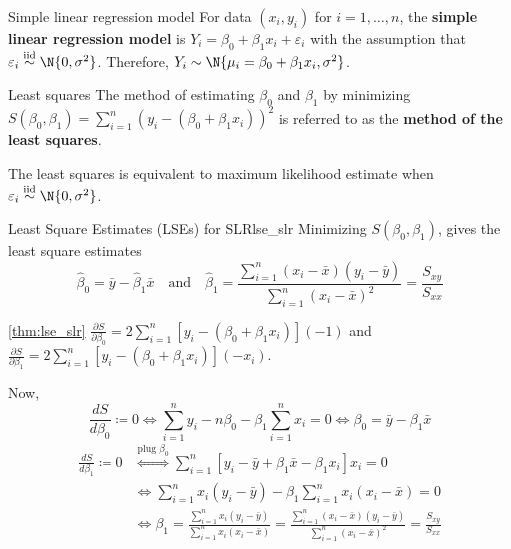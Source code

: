 \begin{Definition}{Simple linear regression model}{}
    For data $ (x_i,y_i) $ for $ i=1,\ldots,n $, the
    \textbf{simple linear regression model} is
    $ Y_i=\beta_0+\beta_1x_i+\varepsilon_i $
    with the assumption that
    $ \varepsilon_i\stackrel{\text{iid}}{\sim}\N{0,\sigma^2} $.
    Therefore,
    $ Y_i\sim \N{\mu_i=\beta_0+\beta_1x_i,\sigma^2} $.
\end{Definition}
\begin{Definition}{Least squares}{}
    The method of estimating $ \beta_0 $
    and $ \beta_1 $ by minimizing
    $ S(\beta_0,\beta_1)=\sum_{i=1}^{n}(y_i-(\beta_0+\beta_1x_i))^2 $
    is referred to as the \textbf{method of the least squares}.
\end{Definition}
\begin{Remark}{}{}
    The least squares is equivalent to maximum likelihood estimate
    when $ \varepsilon_i\stackrel{\text{iid}}{\sim}\N{0,\sigma^2} $.
\end{Remark}
\begin{Theorem}{Least Square Estimates (LSEs) for SLR}{lse_slr}
    Minimizing $ S(\beta_0,\beta_1) $, gives the
    least square estimates
    \[ \hat{\beta}_0=\bar{y}-\hat{\beta}_1\bar{x}\quad\text{and}
        \quad
        \hat{\beta}_1=
        \frac{\sum_{i=1}^{n} (x_i-\bar{x})(y_i-\bar{y})}{
            \sum_{i=1}^{n} (x_i-\bar{x})^2
        }=\frac{S_{xy}}{S_{xx}}   \]
\end{Theorem}
\begin{Proof}{\ref{thm:lse_slr}}{}
    $ \displaystyle \frac{\partial S}{\partial\beta_0}=2
        \sum\limits_{i=1}^{n} \left[ y_i-(\beta_0+\beta_1x_i) \right](-1)
    $ and $ \displaystyle
        \frac{\partial S}{\partial\beta_1}=2
        \sum\limits_{i=1}^{n} \left[ y_i-(\beta_0+\beta_1x_i) \right](-x_i) $.

    Now,
    \[ \frac{dS}{d\beta_0}\coloneq 0
        \iff \sum\limits_{i=1}^{n}y_i-n\beta_0-
        \beta_1 \sum\limits_{i=1}^{n} x_i=0
        \iff \beta_0=\bar{y}-\beta_1\bar{x} \]
    \begin{align*}
        \frac{dS}{d\beta_1}\coloneq 0
         & \stackrel{\text{plug }\beta_0}{\iff}
        \sum\limits_{i=1}^{n} \left[ y_i-\bar{y}+\beta_1\bar{x}-\beta_1 x_i \right]x_i=0 \\
         & \iff \sum\limits_{i=1}^{n} x_i(y_i-\bar{y})-\beta_1
        \sum\limits_{i=1}^{n} x_i(x_i-\bar{x})=0                                         \\
         & \iff \beta_1=\frac{\sum_{i=1}^{n} x_i(y_i-\bar{y})}{\sum_{i=1}^{n}
            x_i
            (x_i-\bar{x})}=\frac{\sum_{i=1}^{n}(x_i-\bar{x})
            (y_i-\bar{y})}{
            \sum_{i=1}^{n} (x_i-\bar{x})^2
        }=\frac{S_{xy}}{S_{xx}}
    \end{align*}
\end{Proof}
